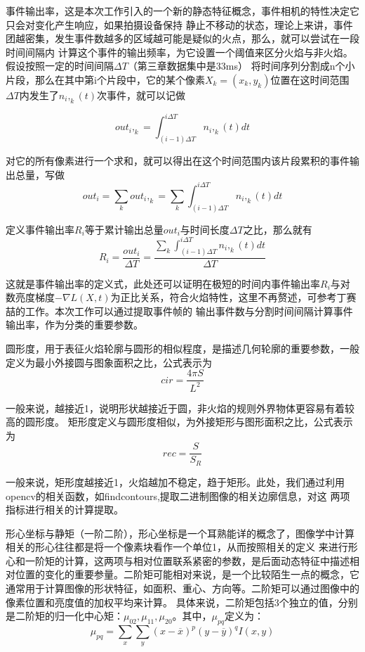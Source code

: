 事件输出率，这是本次工作引入的一个新的静态特征概念，事件相机的特性决定它只会对变化产生响应，如果拍摄设备保持
静止不移动的状态，理论上来讲，事件团越密集，发生事件数越多的区域越可能是疑似的火点，那么，就可以尝试在一段时间间隔内
计算这个事件的输出频率，为它设置一个阈值来区分火焰与非火焰。假设按照一定的时间间隔$\Delta T$（第三章数据集中是33ms）
将时间序列分割成n个小片段，那么在其中第i个片段中，它的某个像素$X_k=(x_k,y_k)$位置在这时间范围$\Delta T$内发生了$n_i,_k(t)$次事件，就可以记做

\begin{equation} 
    out_i,_k=\int_{(i-1)\Delta T}^{i\Delta T} n_i,_k(t) dt
\end{equation}

对它的所有像素进行一个求和，就可以得出在这个时间范围内该片段累积的事件输出总量，写做
\begin{equation} 
    out_i=\sum_{k}out_i,_k=\sum_{k}\int_{(i-1)\Delta T}^{i\Delta T} n_i,_k(t) dt
\end{equation}


定义事件输出率$R_i$等于累计输出总量$out_i$与时间长度$\Delta T$之比，那么就有
\begin{equation} 
R_i=\frac{out_i}{\Delta T}=\frac{\sum_{k}\int_{(i-1)\Delta T}^{i\Delta T} n_i,_k(t) dt}{\Delta T}
\end{equation}

这就是事件输出率的定义式，此处还可以证明在极短的时间内事件输出率$R_i$与对数亮度梯度$- \nabla L(X,t)$为正比关系，符合火焰特性，这里不再赘述，可参考丁赛喆的工作\cite{ding2023}。本次工作可以通过提取事件帧的
输出事件数与分割时间间隔计算事件输出率，作为分类的重要参数。

圆形度，用于表征火焰轮廓与圆形的相似程度，是描述几何轮廓的重要参数，一般定义为最小外接圆与图象面积之比，公式表示为
\begin{equation} 
    cir=\frac{4\pi S}{L^2}
\end{equation}

一般来说，越接近1，说明形状越接近于圆，非火焰的规则外界物体更容易有着较高的圆形度。
矩形度定义与圆形度相似，为外接矩形与图形面积之比，公式表示为
\begin{equation} 
    rec=\frac{S}{S_R}
\end{equation}

一般来说，矩形度越接近1，火焰越加不稳定，趋于矩形。此处，我们通过利用opencv的相关函数，如findcontours,提取二进制图像的相关边廓信息，对这
两项指标进行相关的计算提取。

形心坐标与静矩（一阶二阶），形心坐标是一个耳熟能详的概念了，图像学中计算相关的形心往往都是将一个像素块看作一个单位1，从而按照相关的定义
来进行形心和一阶矩的计算，这两项与相对位置联系紧密的参数，是后面动态特征中描述相对位置的变化的重要参量。二阶矩可能相对来说，是一个比较陌生一点的概念，它通常用于计算图像的形状特征，如面积、重心、方向等。二阶矩可以通过图像中的像素位置和亮度值的加权平均来计算。
具体来说，二阶矩包括3个独立的值，分别是二阶矩的归一化中心矩：$\mu_{02},\mu_{11},\mu_{20}$。其中，$\mu_{pq}$定义为：
\begin{equation} 
    \mu_{pq}=\sum_{x}\sum_{y}(x-\overline{x})^p(y-\overline{y})^qI(x,y)
\end{equation}


